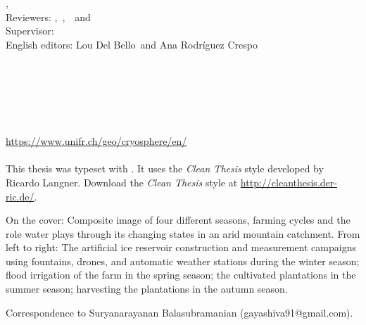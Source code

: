 \hfill
\vfill
{
	\small
	\textbf{\thesisName} \\
	\textit{\thesisTitle} \\
	\thesisSubject, \thesisDate \\
	Reviewers: \thesisFirstReviewer,\ \thesisSecondReviewer,\ \thesisThirdReviewer\ and \thesisFourthReviewer \\
	Supervisor: \thesisFirstSupervisor \\
	English editors: Lou Del Bello\ and Ana Rodríguez Crespo\\[1.5em]
	\textbf{\thesisUniversity} \\
	\textit{\thesisUniversityGroup} \\
	\thesisUniversityDepartment \\
	\thesisUniversityStreetAddress \\
	\thesisUniversityCity \\
	\thesisUniversityPostalCode \\
  \url{https://www.unifr.ch/geo/cryosphere/en/}\\
\\
  This thesis was typeset with \LaTeXe.
  It uses the \textit{Clean Thesis} style developed by Ricardo Langner.
  Download the \textit{Clean Thesis} style at \url{http://cleanthesis.der-ric.de/}.

  On the cover: Composite image of four different seasons, farming cycles and the role water plays through its
  changing states in an arid mountain catchment. From left to right: The artificial ice reservoir construction and
  measurement campaigns using fountains, drones, and automatic weather stations during the winter season; flood
  irrigation of the farm in the spring season; the cultivated plantations in the summer season; harvesting the
  plantations in the autumn season.

  Correspondence to Suryanarayanan Balasubramanian (gayashiva91@gmail.com).
}

